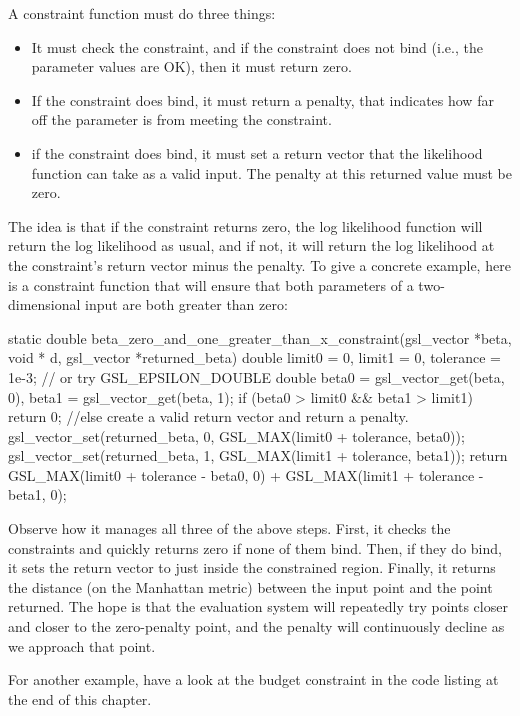 A constraint function must do three things:
\begin{itemize}
\item It must check the constraint, and if the constraint does not bind (i.e., the parameter values are OK), then it must return zero.
\item If the constraint does bind, it must return a penalty, that indicates how far off the parameter is from meeting the constraint.
\item if the constraint does bind, it must set a return vector that the likelihood function can take as a valid input. The penalty at this returned value must be zero.
\end{itemize}

The idea is that if the constraint returns zero, the log likelihood
function will return the log likelihood as usual, and if not, it will
return the log likelihood at the constraint's return vector minus the
penalty. To give a concrete example, here is a constraint function that
will ensure that both parameters of a two-dimensional input are both
greater than zero:

static double beta_zero_and_one_greater_than_x_constraint(gsl_vector *beta, 
                                    void * d, gsl_vector *returned_beta){
double          limit0          = 0,
                limit1          = 0,
                tolerance       = 1e-3; // or try GSL_EPSILON_DOUBLE
double          beta0   = gsl_vector_get(beta, 0),
                beta1   = gsl_vector_get(beta, 1);
        if (beta0 > limit0 && beta1 > limit1)
                return 0;
        //else create a valid return vector and return a penalty.
        gsl_vector_set(returned_beta, 0, GSL_MAX(limit0 + tolerance, beta0)); 
        gsl_vector_set(returned_beta, 1, GSL_MAX(limit1 + tolerance, beta1));
        return GSL_MAX(limit0 + tolerance - beta0, 0) 
                        + GSL_MAX(limit1 + tolerance - beta1, 0); 
}

Observe how it manages all three of the above steps. First, it checks
the constraints and quickly returns zero if none of them bind. Then, if
they do bind, it sets the return vector to just inside the constrained
region. Finally, it returns the distance (on the Manhattan metric)
between the input point and the point returned. The hope is that the
evaluation system will repeatedly try points closer and closer to the
zero-penalty point, and the penalty will continuously decline as we
approach that point.

For another example, have a look at the budget constraint in the code
listing at the end of this chapter.

